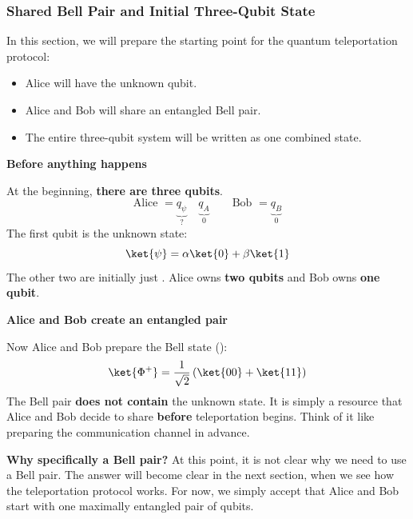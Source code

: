 \subsubsection{Shared Bell Pair and Initial Three-Qubit State}\label{sec:shared-bell-pair-and-initial-three-qubit-state}

In this section, we will prepare the starting point for the quantum teleportation protocol:
\begin{itemize}
    \item Alice will have the unknown qubit.
    \item Alice and Bob will share an entangled Bell pair.
    \item The entire three-qubit system will be written as one combined state.
\end{itemize}

\highspace
\begin{flushleft}
    \textcolor{Green3}{ \textbf{Before anything happens}}
\end{flushleft}
At the beginning, \textbf{there are three qubits}.
\begin{equation*}
    \text{Alice } = \underbrace{q_{\psi}}_{?} \quad \underbrace{q_A}_{0} \qquad \text{Bob } = \underbrace{q_B}_{0} 
\end{equation*}
The first qubit is the unknown state:
\begin{equation*}
    \ket{\psi} = \alpha \ket{0} + \beta \ket{1}
\end{equation*}
The other two are initially just . Alice owns \textbf{two qubits} and Bob owns \textbf{one qubit}.

\highspace
\begin{flushleft}
    \textcolor{Green3}{ \textbf{Alice and Bob create an entangled pair}}
\end{flushleft}
Now Alice and Bob prepare the Bell state ():
\begin{equation}\label{eq:bell-pair-quantum-teleportation}
    \ket{\Phi^+} = \frac{1}{\sqrt{2}} \left( \ket{00} + \ket{11} \right)
\end{equation}
The Bell pair \textbf{does not contain} the unknown state. It is simply a resource that Alice and Bob decide to share \textbf{before} teleportation begins. Think of it like preparing the communication channel in advance.

\highspace
\textcolor{Green3}{ \textbf{Why specifically a Bell pair?}} At this point, it is not clear why we need to use a Bell pair. The answer will become clear in the next section, when we see how the teleportation protocol works. For now, we simply accept that Alice and Bob start with one maximally entangled pair of qubits.

